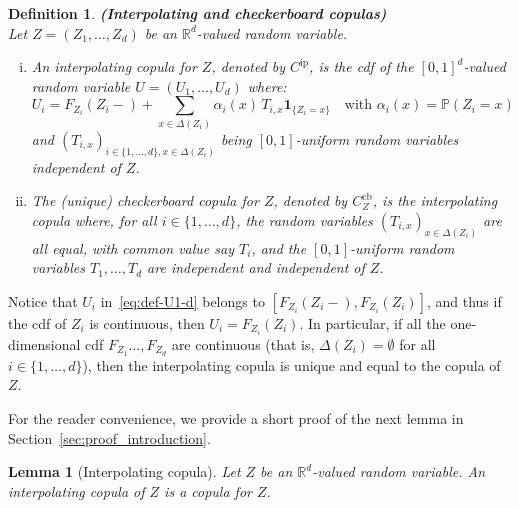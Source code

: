 \documentclass[12pt]{article}
\renewcommand{\P}{{\mathbb P}}
\newcommand{\R}{{\mathbb R}}
\newcommand{\ind}{\mathbf{1}}
\newcommand{\Cb}{C^\mathrm{cb}}
\newcommand{\Cip}{C^\mathrm{ip}}
\theoremstyle{plain}
\newtheorem{lem}[theo]{Lemma}
\newtheorem{defi}{Definition}
\theoremstyle{remark}
\begin{document}
\begin{defi}{\bf (Interpolating  and checkerboard  copulas)} \\
  \label{defi:interpol-cop}
  Let $Z=(Z_1,  \ldots, Z_d)$  be an  $\R^d$-valued random  variable.
\begin{enumerate}[(i)]
\item \label{item:interpol-cop}  An interpolating  copula for $Z$, denoted by $\Cip$, is the
  cdf of the $[0, 1]^d$-valued random variable $U=(U_1, \ldots, U_d)$ where:
 \begin{equation}
     \label{eq:def-U1-d}
    U_i=F_{Z_i}(Z_i-) + \sum_{x\in \Delta(Z_i)} \alpha_i(x)
   \,  T_{i,x} \ind_{\{Z_i=x\}}
     \quad\text{with}\,\,
     \alpha_i(x)=\P(Z_i=x) 
\end{equation} 
and  $(T_{i,x})_{i\in  \{1, \ldots,  d\}, x\in  \Delta(Z_i)}$ being 
 $[0,1]$-uniform random variables independent of $Z$.


\item The (unique) checkerboard copula for $Z$,  denoted by $\Cb_Z$, is the 
  interpolating  copula where,  for  all $i\in  \{1,  \ldots, d\}$,  the
  random variables  $(T_{i,x})_{x\in \Delta(Z_i)}$  are all  equal, with
  common  value  say $T_i$,  and  the  $[0,1]$-uniform random  variables
  $T_1, \ldots, T_d$ are independent and independent of $Z$.   
\end{enumerate}
\end{defi}

Notice that $U_i$ in~\eqref{eq:def-U1-d} belongs to $ [F_{Z_i}(Z_i-), F_{Z_i}(Z_i)]$,  and thus if the cdf
of $Z_i$ is continuous, then  $U_i=F_{Z_i}(Z_i)$.  In particular, if all
the one-dimensional  cdf $F_{Z_1}\ldots,  F_{Z_d}$ are  continuous (that
is, $\Delta(Z_i)=\emptyset$ for  all $i\in \{1, \ldots,  d\}$), then the
interpolating copula is unique and equal to the copula of $Z$. 


For the reader convenience, we provide a short proof of the next lemma  in
Section~\ref{sec:proof_introduction}. 

\begin{lem}[Interpolating copula]
  \label{lem:interpol-cop=cop}
   Let $Z$ be an  $\R^d$-valued  random variable. An interpolating
   copula of $Z$ is a copula for $Z$. 
\end{lem}
\end{document}
